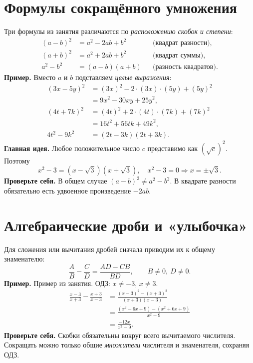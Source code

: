 \documentclass[a4paper,12pt]{article}
\newcommand{\idea}[1]{\textcolor{darkaccent}{\textbf{Главная идея.}} #1}
\newcommand{\attention}[1]{\textcolor{darkaccent}{\textbf{Проверьте себя.}} #1}
\newcommand{\ex}[1]{\textcolor{darkaccent}{\textbf{Пример.}} #1}
\begin{document}
\section{Формулы сокращённого умножения}
Три формулы из занятия различаются по \emph{расположению скобок и степени}:
\begin{align*}
(a-b)^2&=a^2-2ab+b^2&&\text{(квадрат разности)},\\
(a+b)^2&=a^2+2ab+b^2&&\text{(квадрат суммы)},\\
a^2-b^2&=(a-b)(a+b)&&\text{(разность квадратов)}.
\end{align*}
\ex{Вместо \(a\) и \(b\) подставляем \emph{целые выражения}:}
\begin{align*}
(3x-5y)^2
&=(3x)^2-2\cdot(3x)\cdot(5y)+(5y)^2\\
&=9x^2-30xy+25y^2,\\[2pt]
(4t+7k)^2
&=(4t)^2+2\cdot(4t)\cdot(7k)+(7k)^2\\
&=16t^2+56tk+49k^2,\\[2pt]
4t^2-9k^2&=(2t-3k)(2t+3k).
\end{align*}
\idea{Любое положительное число \(c\) представимо как \((\sqrt c)^2\). Поэтому}
\[
x^2-3=(x-\sqrt3)(x+\sqrt3),
\quad x^2-3=0\Longrightarrow x=\pm\sqrt3.
\]
\attention{В общем случае \((a-b)^2\ne a^2-b^2\). В квадрате разности обязательно есть удвоенное произведение \(-2ab\).}

\section{Алгебраические дроби и «улыбочка»}
Для сложения или вычитания дробей сначала приводим их к общему знаменателю:
\[
\frac{A}{B}-\frac{C}{D}=\frac{AD-CB}{BD},\qquad B\ne0,\ D\ne0.
\]
\ex{Пример из занятия. ОДЗ: \(x\ne-3\), \(x\ne3\).}
\begin{align*}
\frac{x-3}{x+3}-\frac{x+3}{x-3}
&=\frac{(x-3)^2-(x+3)^2}{(x+3)(x-3)}\\
&=\frac{(x^2-6x+9)-(x^2+6x+9)}{x^2-9}\\
&=\boxed{\frac{-12x}{x^2-9}}.
\end{align*}
\attention{Скобки обязательны вокруг всего вычитаемого числителя. Сокращать можно только общие \emph{множители} числителя и знаменателя, сохраняя ОДЗ.}
\end{document}
